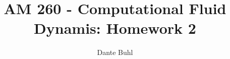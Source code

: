 \documentclass{article}
\begin{document}
\title{AM 260 - Computational Fluid Dynamis: Homework 2}
\author{Dante Buhl}


\newcommand{\wrms}{w_{\text{rms}}}
\newcommand{\bs}[1]{\boldsymbol{#1}}
\newcommand{\tb}[1]{\textbf{#1}}
\newcommand{\bmp}[1]{\begin{minipage}{#1\textwidth}}
\newcommand{\emp}{\end{minipage}}
\newcommand{\R}{\mathbb{R}}
\newcommand{\C}{\mathbb{C}}
\newcommand{\N}{\mathcal{N}}
\newcommand{\m}{\bs{\mu}_*}
\newcommand{\s}{\bs{\Sigma}_*}
\newcommand{\dt}{\Delta t}
\newcommand{\dx}{\Delta x}
\newcommand{\tr}[1]{\text{Tr}(#1)}
\newcommand{\Tr}[1]{\text{Tr}(#1)}
\newcommand{\Div}{\nabla \cdot}
\renewcommand{\div}{\nabla \cdot}
\newcommand{\Curl}{\nabla \times}
\newcommand{\Grad}{\nabla}
\newcommand{\grad}{\nabla}
\newcommand{\grads}{\nabla_s}
\newcommand{\gradf}{\nabla_f}
\newcommand{\xs}{x_s}
\newcommand{\x}{\bs{x}}
\newcommand{\xf}{x_f}
\newcommand{\ts}{t_s}
\newcommand{\tf}{t_f}
\newcommand{\pt}{\partial t}
\newcommand{\pz}{\partial z}
\newcommand{\uvec}{\bs{u}}
\newcommand{\bvec}{\bs{B}}
\newcommand{\nvec}{\hat{\bs{n}}}
\newcommand{\tu}{\tilde{\uvec}}
\newcommand{\B}{\bs{B}}
\newcommand{\A}{\bs{A}}
\newcommand{\jvec}{\bs{j}}
\newcommand{\F}{\bs{F}}
\newcommand{\T}{\tilde{T}}
\newcommand{\ez}{\bs{e}_z}
\newcommand{\ex}{\bs{e}_x}
\newcommand{\ey}{\bs{e}_y}
\newcommand{\eo}{\bs{e}_{\bs{\Omega}}}
\newcommand{\ppt}[1]{\frac{\partial #1}{\partial t}}
\newcommand{\pp}[2]{\frac{\partial #1}{\partial #2}}
\newcommand{\pptwo}[2]{\frac{\partial^2 #1}{\partial #2^2}}
\newcommand{\ddtwo}[2]{\frac{d^2 #1}{d #2^2}}
\newcommand{\DDt}[1]{\frac{D #1}{D t}}
\newcommand{\ppts}[1]{\frac{\partial #1}{\partial t_s}}
\newcommand{\pptf}[1]{\frac{\partial #1}{\partial t_f}}
\newcommand{\ppz}[1]{\frac{\partial #1}{\partial z}}
\newcommand{\ddz}[1]{\frac{d #1}{d z}}
\newcommand{\ppzetas}[1]{\frac{\partial^2 #1}{\partial \zeta^2}}
\newcommand{\ppzs}[1]{\frac{\partial #1}{\partial z_s}}
\newcommand{\ppzf}[1]{\frac{\partial #1}{\partial z_f}}
\newcommand{\ppx}[1]{\frac{\partial #1}{\partial x}}
\newcommand{\ddx}[1]{\frac{d #1}{d x}}
\newcommand{\ppxi}[1]{\frac{\partial #1}{\partial x_i}}
\newcommand{\ppxj}[1]{\frac{\partial #1}{\partial x_j}}
\newcommand{\ppy}[1]{\frac{\partial #1}{\partial y}}
\newcommand{\ppzeta}[1]{\frac{\partial #1}{\partial \zeta}}
\renewcommand{\k}{\bs{k}}
\newcommand{\real}[1]{\text{Re}\left[#1\right]}


\maketitle 
\setlength{\parindent}{0pt}
\end{document}
